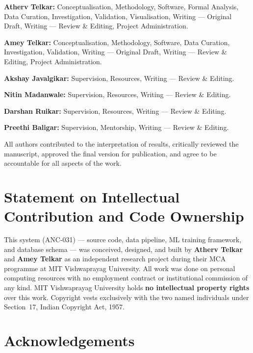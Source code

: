 \documentclass[10pt,twocolumn]{article}
\begin{document}
\textbf{Atherv Telkar:} Conceptualisation, Methodology, Software, Formal Analysis, Data Curation, Investigation, Validation, Visualisation, Writing --- Original Draft, Writing --- Review \& Editing, Project Administration.
 
\textbf{Amey Telkar:} Conceptualisation, Methodology, Software, Data Curation, Investigation, Validation, Writing --- Original Draft, Writing --- Review \& Editing, Project Administration.
 
\textbf{Akshay Javalgikar:} Supervision, Resources, Writing --- Review \& Editing.
 
\textbf{Nitin Madanwale:} Supervision, Resources, Writing --- Review \& Editing.
 
\textbf{Darshan Ruikar:} Supervision, Resources, Writing --- Review \& Editing.
 
\textbf{Preethi Baligar:} Supervision, Mentorship, Writing --- Review \& Editing.
 
All authors contributed to the interpretation of results, critically reviewed the manuscript, approved the final version for publication, and agree to be accountable for all aspects of the work.
 
\section*{Statement on Intellectual Contribution and Code Ownership}
 
This system (ANC-031) --- source code, data pipeline, ML
training framework, and database schema --- was conceived,
designed, and built by \textbf{Atherv Telkar} and
\textbf{Amey Telkar} as an independent research project
during their MCA programme at MIT Vishwaprayag University. All
work was done on personal computing resources with no employment
contract or institutional commission of any kind. MIT Vishwaprayag
University holds \textbf{no intellectual property rights} over
this work. Copyright vests exclusively with the two named
individuals under Section~17, Indian Copyright Act, 1957.
 
\section*{Acknowledgements}
 
\end{document}
